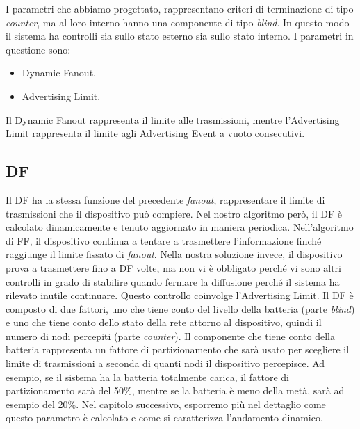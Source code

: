 I parametri che abbiamo progettato, rappresentano criteri di terminazione di tipo \textit{counter}, ma al loro interno hanno una componente di tipo \textit{blind}. In questo modo il sistema ha controlli sia sullo stato esterno sia sullo stato interno. I parametri in questione sono:
\begin{itemize}
	\item Dynamic Fanout.
	\item Advertising Limit.
\end{itemize}
Il Dynamic Fanout rappresenta il limite alle trasmissioni, mentre l'Advertising Limit rappresenta il limite agli Advertising Event a vuoto consecutivi.

\subsection{\acf{DF}}
Il \acf{DF} ha la stessa funzione del precedente \textit{fanout}, rappresentare il limite di trasmissioni che il dispositivo può compiere. Nel nostro algoritmo però, il \acs{DF} è calcolato dinamicamente e tenuto aggiornato in maniera periodica. Nell'algoritmo di \acs{FF}, il dispositivo continua a tentare a trasmettere l'informazione finché raggiunge il limite fissato di \textit{fanout}. Nella nostra soluzione invece, il dispositivo prova a trasmettere fino a \acs{DF} volte, ma non vi è obbligato perché vi sono altri controlli in grado di stabilire quando fermare la diffusione perché il sistema ha rilevato inutile continuare. Questo controllo coinvolge l'Advertising Limit. Il \acs{DF} è composto di due fattori, uno che tiene conto del livello della batteria (parte \textit{blind}) e uno che tiene conto dello stato della rete attorno al dispositivo, quindi il numero di nodi percepiti (parte \textit{counter}). Il componente che tiene conto della batteria rappresenta un fattore di partizionamento che sarà usato per scegliere il limite di trasmissioni a seconda di quanti nodi il dispositivo percepisce. Ad esempio, se il sistema ha la batteria totalmente carica, il fattore di partizionamento sarà del 50\%, mentre se la batteria è meno della metà, sarà ad esempio del 20\%. Nel capitolo successivo, esporremo più nel dettaglio come questo parametro è calcolato e come si caratterizza l'andamento dinamico.

